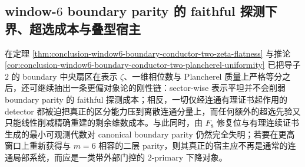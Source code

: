 \subsection{window-\texorpdfstring{$6$}{6} boundary parity 的 faithful 探测下界、超选成本与叠型宿主}\label{subsec:conclusion-window6-boundary-detector-sideinfo-stack-rigidity}
在定理 \ref{thm:conclusion-window6-boundary-conductor-two-zeta-flatness} 与推论 \ref{cor:conclusion-window6-boundary-conductor-two-plancherel-uniformity} 已把导子 \(2\) 的 boundary 中央扇区在表示 \(\zeta\)、一维相位数与 Plancherel 质量上严格等分之后，还可继续抽出一条更偏对象论的刚性链：sector-wise 表示平坦并不会削弱 boundary parity 的 faithful 探测成本；相反，一切仅经连通有理证书起作用的 detector 都被迫把真正的区分能力压到离散连通分量上，而任何额外的超选先验又只能线性削减精确重建的剩余维数成本。与此同时，由 \(F_8\) 修复位与有理连续证书生成的最小可观测代数对 canonical boundary parity 仍然完全失明；若要在更高窗口上重新获得与 \(m=6\) 相容的二层 parity，则其真正的宿主应不再是通常的连通局部系统，而应是一类带外部门控的 \(2\)-primary 下降对象。

